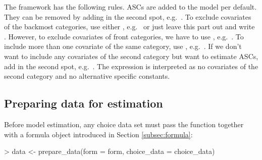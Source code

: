 \documentclass[article,shortnames]{jss}
\newcommand{\fct}[1]{\code{#1()}}
\begin{document}
The framework has the following rules. ASCs are added to the model per default. They can be removed by adding  in the second spot, e.g.\ . To exclude covariates of the backmost categories, use either , e.g.\  or just leave this part out and write . However, to exclude covariates of front categories, we have to use , e.g.\ . To include more than one covariate of the same category, use \code{+}, e.g.\ . If we don't want to include any covariates of the second category but want to estimate ASCs, add  in the second spot, e.g.\ . The expression  is interpreted as no covariates of the second category and no alternative specific constants.

\subsection{Preparing data for estimation} \label{subsec:prepare_data}

Before model estimation, any choice data set  must pass the \fct{prepare\_data} function together with a formula object  introduced in Section \ref{subsec:formula}:

\begin{Schunk}
\begin{Sinput}
> data <- prepare_data(form = form, choice_data = choice_data)
\end{Sinput}
\end{Schunk}
\end{document}
